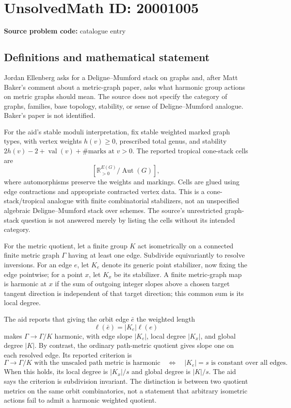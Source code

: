 \documentclass[11pt]{article}
\newcommand{\R}{\mathbb{R}}
\begin{document}
\section*{UnsolvedMath ID: 20001005}
\textbf{Source problem code:} catalogue entry
\subsection{Definitions and mathematical statement}
Jordan Ellenberg asks for a Deligne--Mumford stack on graphs and, after Matt Baker's comment about a metric-graph paper, asks what harmonic group actions on metric graphs should mean. The source does not specify the category of graphs, families, base topology, stability, or sense of Deligne--Mumford analogue. Baker's paper is not identified.

For the aid's stable moduli interpretation, fix stable weighted marked graph types, with vertex weights \(h(v)\ge0\), prescribed total genus, and stability \(2h(v)-2+\operatorname{val}(v)+\#\text{marks at }v>0\). The reported tropical cone-stack cells are
\[
 [\R_{>0}^{E(G)}/\operatorname{Aut}(G)],
\]
where automorphisms preserve the weights and markings. Cells are glued using edge contractions and appropriate contracted vertex data. This is a cone-stack/tropical analogue with finite combinatorial stabilizers, not an unspecified algebraic Deligne--Mumford stack over schemes. The source's unrestricted graph-stack question is not answered merely by listing the cells without its intended category.

For the metric quotient, let a finite group \(K\) act isometrically on a connected finite metric graph \(\Gamma\) having at least one edge. Subdivide equivariantly to resolve inversions. For an edge \(e\), let \(K_e\) denote its generic point stabilizer, now fixing the edge pointwise; for a point \(x\), let \(K_x\) be its stabilizer. A finite metric-graph map is harmonic at \(x\) if the sum of outgoing integer slopes above a chosen target tangent direction is independent of that target direction; this common sum is its local degree.

The aid reports that giving the orbit edge \(\bar e\) the weighted length
\[
 \ell(\bar e)=|K_e|\ell(e)
\]
makes \(\Gamma\to\Gamma/K\) harmonic, with edge slope \(|K_e|\), local degree \(|K_x|\), and global degree \(|K|\). By contrast, the ordinary path-metric quotient gives slope one on each resolved edge. Its reported criterion is
\[
 \Gamma\longrightarrow\Gamma/K\text{ with the unscaled path metric is harmonic}
 \quad\Longleftrightarrow\quad
 |K_e|=s\text{ is constant over all edges}.
\]
When this holds, its local degree is \(|K_x|/s\) and global degree is \(|K|/s\). The aid says the criterion is subdivision invariant. The distinction is between two quotient metrics on the same orbit combinatorics, not a statement that arbitrary isometric actions fail to admit a harmonic weighted quotient.
\end{document}

